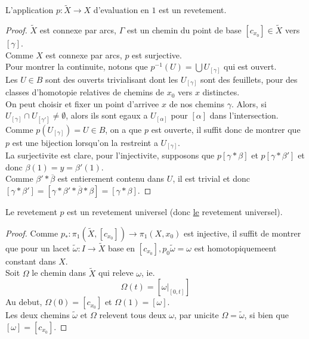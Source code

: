 \documentclass[../main.tex]{subfiles}
\begin{document}
\begin{propo}
L'application $p: \tilde X \to X$ d'evaluation en $1$ est un revetement.
\end{propo}
\begin{proof}
	$\tilde X$ est connexe par arcs, $\Gamma$ est un chemin du point de base $ [ c_{x_0} ] \in \tilde X$ vers $[\gamma]$.\\
	Comme $X$ est connexe par arcs, $p$ est surjective.\\
	Pour montrer la continuite, notons que $p^{-1}( U) = \bigcup U_{[\gamma]} $ qui est ouvert.\\
	Les $U \in B$ sont des ouverts trivialisant dont les $U_{ [ \gamma] } $ sont des feuillets, pour des classes d'homotopie relatives de chemins de $x_0$ vers $x$ distinctes.\\
	On peut choisir et fixer un point d'arrivee $x$ de nos chemins $\gamma$.
Alors, si $U_{ [ \gamma] } \cap U_{ [ \gamma'] }\neq \emptyset $, alors ils sont egaux a $ U_{ [ \alpha] } $ pour  $ [ \alpha] $ dans l'intersection.\\
Comme $p(  U_{ [ \gamma] } ) = U\in B$, on a que $p$ est ouverte, il suffit donc de montrer que $p$ est une bijection lorsqu'on la restreint a $U_{ [\gamma] } $.\\
La surjectivite est clare, pour l'injectivite, supposons que $ p[ \gamma\ast\beta] $ et $ p [ \gamma \ast \beta'] $ et donc $\beta( 1) = y = \beta'( 1) $.\\
Comme $\beta' \ast \overline{\beta}$ est entierement contenu dans $U$, il est trivial et donc $ [ \gamma\ast \beta'] = [ \gamma \ast \beta' \ast \overline{\beta} \ast \beta] = [ \gamma\ast\beta] $.
\end{proof}
\begin{thm}
	Le revetement $p$ est un revetement universel (donc \underline{le} revetement universel).
\end{thm}
\begin{proof}
Comme $p_\ast : \pi_1 ( \tilde X , [ c_{x_0} ] ) \to \pi_1( X,x_0)$ est injective, il suffit de montrer que pour un lacet $\tilde\omega: I\to \tilde X$ base en $ [ c_{x_0} ], p_0\tilde\omega = \omega$ est homotopiquemeent constant dans $X$.\\
Soit $\Omega$ le chemin dans $\tilde X$ qui releve $\omega$, ie.
\[ 
\Omega( t) = [ \omega|_{ [ 0,t] } ] 
\]
Au debut, $\Omega( 0) = [ c_{x_0} ] $ et $\Omega( 1) = [ \omega] $.\\
Les deux chemins $\tilde \omega$ et $\Omega$ relevent tous deux $\omega$, par unicite $\Omega= \tilde \omega$, si bien que $ [ \omega] = [ c_{x_0} ] $.
\end{proof}
\end{document}
